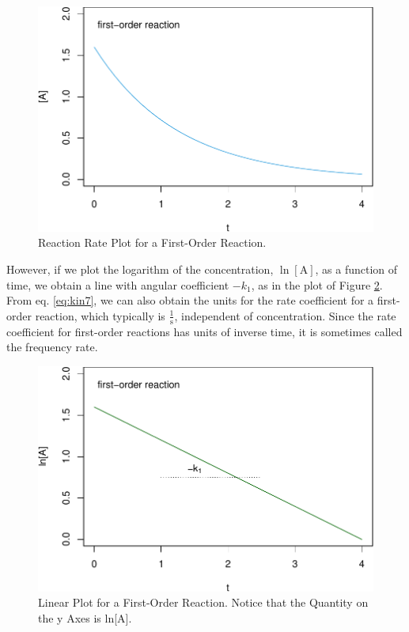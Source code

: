 \documentclass[
  9pt,
]{extbook}
\theoremstyle{definition}
\theoremstyle{definition}
\theoremstyle{definition}
\theoremstyle{definition}
\theoremstyle{remark}
\begin{document}
\begin{figure}

{\centering \includegraphics{pchem1_files/figure-latex/figk2-1} 

}

\caption{Reaction Rate Plot for a First-Order Reaction.}\label{fig:figk2}
\end{figure}

However, if we plot the logarithm of the concentration, \(\ln[\mathrm{A}]\), as a function of time, we obtain a line with angular coefficient \(-k_1\), as in the plot of Figure \ref{fig:figk3}. From eq. \eqref{eq:kin7}, we can also obtain the units for the rate coefficient for a first-order reaction, which typically is \(\frac{1}{\mathrm{s}}\), independent of concentration. Since the rate coefficient for first-order reactions has units of inverse time, it is sometimes called the frequency rate.

\begin{figure}

{\centering \includegraphics{pchem1_files/figure-latex/figk3-1} 

}

\caption{Linear Plot for a First-Order Reaction. Notice that the Quantity on the y Axes is ln[A].}\label{fig:figk3}
\end{figure}
\end{document}
